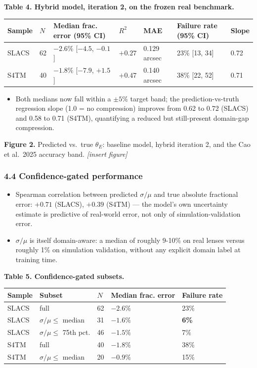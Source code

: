 \documentclass[
  11pt,
]{article}
\providecommand{\tightlist}{%
  \setlength{\itemsep}{0pt}\setlength{\parskip}{0pt}}
\begin{document}
\textbf{Table 4. Hybrid model, iteration 2, on the frozen real
benchmark.}

\begin{longtable}[]{@{}lllllll@{}}
\toprule
Sample & \(N\) & Median frac. error (95\% CI) & \(R^2\) & MAE & Failure
rate (95\% CI) & Slope \\
\midrule
\endhead
SLACS & 62 & \(-2.6\%\) {[}\(-4.5\), \(-0.1\){]} & \(+0.27\) & 0.129
arcsec & 23\% {[}13, 34{]} & 0.72 \\
S4TM & 40 & \(-1.8\%\) {[}\(-7.9\), \(+1.5\){]} & \(+0.47\) & 0.140
arcsec & 38\% {[}22, 52{]} & 0.71 \\
\bottomrule
\end{longtable}

\begin{itemize}
\tightlist
\item
  Both medians now fall within a \(\pm 5\%\) target band; the
  prediction-vs-truth regression slope (1.0 = no compression) improves
  from 0.62 to 0.72 (SLACS) and 0.58 to 0.71 (S4TM), quantifying a
  reduced but still-present domain-gap compression.
\end{itemize}

\textbf{Figure 2.} Predicted vs.~true \(\theta_E\): baseline model,
hybrid iteration 2, and the Cao et al.~2025 accuracy band.
\emph{{[}insert figure{]}}

\hypertarget{confidence-gated-performance}{%
\subsubsection{4.4 Confidence-gated
performance}\label{confidence-gated-performance}}

\begin{itemize}
\tightlist
\item
  Spearman correlation between predicted \(\sigma/\mu\) and true
  absolute fractional error: \(+0.71\) (SLACS), \(+0.39\) (S4TM) --- the
  model's own uncertainty estimate is predictive of real-world error,
  not only of simulation-validation error.
\item
  \(\sigma/\mu\) is itself domain-aware: a median of roughly 9-10\% on
  real lenses versus roughly 1\% on simulation validation, without any
  explicit domain label at training time.
\end{itemize}

\textbf{Table 5. Confidence-gated subsets.}

\begin{longtable}[]{@{}lllll@{}}
\toprule
Sample & Subset & \(N\) & Median frac. error & Failure rate \\
\midrule
\endhead
SLACS & full & 62 & \(-2.6\%\) & 23\% \\
SLACS & \(\sigma/\mu \le\) median & 31 & \(-1.6\%\) & \textbf{6\%} \\
SLACS & \(\sigma/\mu \le\) 75th pct. & 46 & \(-1.5\%\) & 7\% \\
S4TM & full & 40 & \(-1.8\%\) & 38\% \\
S4TM & \(\sigma/\mu \le\) median & 20 & \(-0.9\%\) & 15\% \\
\bottomrule
\end{longtable}
\end{document}

